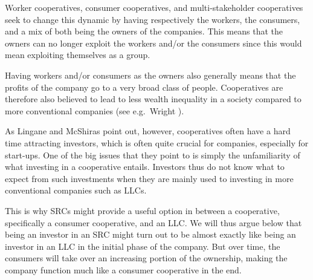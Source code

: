 \documentclass{article}
\begin{document}
Worker cooperatives, consumer cooperatives, and multi-stakeholder cooperatives seek to change this dynamic by having respectively the workers, the consumers, and a mix of both being the owners of the companies. This means that the owners can no longer exploit the workers and/or the consumers since this would mean exploiting themselves as a group. 

Having workers and/or consumers as the owners also generally means that the profits of the company go to a very broad class of people. Cooperatives are therefore also believed to lead to less wealth inequality in a society compared to more conventional companies (see e.g.\ Wright \cite{Wright}). 

As Lingane and McShiras \cite{Lingane and McShiras_2} %
point out, however, cooperatives often have a hard time attracting investors, which is often quite crucial for companies, especially for start-ups. %
One of the big issues that they point to is simply the unfamiliarity of what investing in a cooperative entails. Investors thus do not know what to expect from such investments when they are mainly used to investing in more conventional companies such as LLCs. 

This is why SRCs might provide a useful option in between a cooperative, specifically a consumer cooperative, and an LLC. We will thus argue below that being an investor in an SRC might turn out to be almost exactly like being an investor in an LLC in the initial phase of the company. But over time, the consumers will take over an increasing portion of the ownership, making the company function much like a consumer cooperative in the end. 
\end{document}
